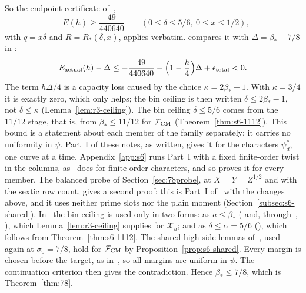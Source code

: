 \documentclass[11pt]{article}
\numberwithin{equation}{section}
\begin{document}
So the endpoint certificate of~\cite[Lemma~20.2]{OAI78},
\begin{equation}\label{eq:d085}
 -E(h)\ge\frac{49}{440640}\qquad(0\le\delta\le5/6,\ 0\le x\le1/2),
\end{equation}
with $q=x\delta$ and $R=R_*(\delta,x)$,
applies verbatim. \cite{OAI78} compares it with $\Delta=\beta_*-7/8$ in
\cite[eq.~(20.10)]{OAI78}:
\begin{equation}\label{eq:d086}
 E_{\rm actual}(h)-\Delta\le-\frac{49}{440640}-\Bigl(1-\frac h4\Bigr)\Delta+\epsilon_{\rm total}<0 .
\end{equation}
The term $h\Delta/4$ is a capacity loss caused by the choice $\kappa=2\beta_*-1$. With $\kappa=3/4$ it
is exactly zero, which only helps; the bin ceiling is then written $\delta\le2\beta_*-1$, not $\delta\le\kappa$
(Lemma~\ref{lem:r3-ceiling}).
The bin ceiling $\delta\le5/6$ comes from the $11/12$ stage, that is, from $\beta_*\le11/12$ for
$\mathcal F_{\rm CM}$ (Theorem~\ref{thm:s6-1112}). This bound is a statement about each member of the family
separately; it carries no uniformity in $\psi$. Part~I of these notes, as written, gives it for the characters
$\psi_d^*$, one curve at a time. Appendix~\ref{app:s6} runs Part~I with a fixed finite-order twist in the
columns, as~\cite{OAI1112} does for finite-order characters, and so proves it for every member. The balanced
probe of Section~\ref{sec:78probe}, at $X=Y=Z^{1/2}$ and with the sextic row count, gives a second proof: this
is Part~I of~\cite{OAI78} with the changes above, and it uses neither prime slots nor the plain moment
(Section~\ref{subsec:s6-shared}). In~\cite{OAI78} the bin ceiling is used only in two forms: as $a\le\beta_*$
(\cite[proof of Lemma~10.3]{OAI78} and, through~\cite[eq.~(12.2)]{OAI78}, \cite[proof of Lemma~20.1]{OAI78}), which Lemma~\ref{lem:r3-ceiling} supplies for
$\mathcal X_u$; and as $\delta\le\alpha=5/6$ (\cite[proof of Proposition~19.2, \emph{Cases requiring no selected primes}; Lemma~20.2; Section~20.5; proof of Proposition~20.3]{OAI78}), which follows from
Theorem~\ref{thm:s6-1112}. The shared high-side lemmas of~\cite{OAI78}, used again at $\sigma_0=7/8$, hold for
$\mathcal F_{\rm CM}$ by Proposition~\ref{prop:s6-shared}. Every margin is chosen before the target, as
in~\cite{OAI78}, so all margins are uniform in $\psi$. The continuation criterion then gives the
contradiction. Hence $\beta_*\le7/8$, which is Theorem~\ref{thm:78}.
\end{document}
